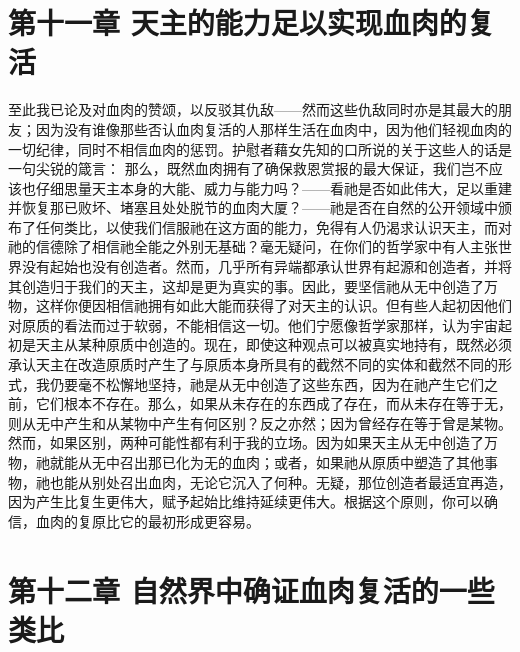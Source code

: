 
\section{第十一章 天主的能力足以实现血肉的复活}

至此我已论及对血肉的赞颂，以反驳其仇敌——然而这些仇敌同时亦是其最大的朋友；因为没有谁像那些否认血肉复活的人那样生活在血肉中，因为他们轻视血肉的一切纪律，同时不相信血肉的惩罚。护慰者藉女先知的口所说的关于这些人的话是一句尖锐的箴言： 那么，既然血肉拥有了确保救恩赏报的最大保证，我们岂不应该也仔细思量天主本身的大能、威力与能力吗？——看祂是否如此伟大，足以重建并恢复那已败坏、堵塞且处处脱节的血肉大厦？——祂是否在自然的公开领域中颁布了任何类比，以使我们信服祂在这方面的能力，免得有人仍渴求认识天主，而对祂的信德除了相信祂全能之外别无基础？毫无疑问，在你们的哲学家中有人主张世界没有起始也没有创造者。然而，几乎所有异端都承认世界有起源和创造者，并将其创造归于我们的天主，这却是更为真实的事。因此，要坚信祂从无中创造了万物，这样你便因相信祂拥有如此大能而获得了对天主的认识。但有些人起初因他们对原质的看法而过于软弱，不能相信这一切。他们宁愿像哲学家那样，认为宇宙起初是天主从某种原质中创造的。现在，即使这种观点可以被真实地持有，既然必须承认天主在改造原质时产生了与原质本身所具有的截然不同的实体和截然不同的形式，我仍要毫不松懈地坚持，祂是从无中创造了这些东西，因为在祂产生它们之前，它们根本不存在。那么，如果从未存在的东西成了存在，而从未存在等于无，则从无中产生和从某物中产生有何区别？反之亦然；因为曾经存在等于曾是某物。然而，如果区别，两种可能性都有利于我的立场。因为如果天主从无中创造了万物，祂就能从无中召出那已化为无的血肉；或者，如果祂从原质中塑造了其他事物，祂也能从别处召出血肉，无论它沉入了何种。无疑，那位创造者最适宜再造，因为产生比复生更伟大，赋予起始比维持延续更伟大。根据这个原则，你可以确信，血肉的复原比它的最初形成更容易。\par


\section{第十二章 自然界中确证血肉复活的一些类比}

